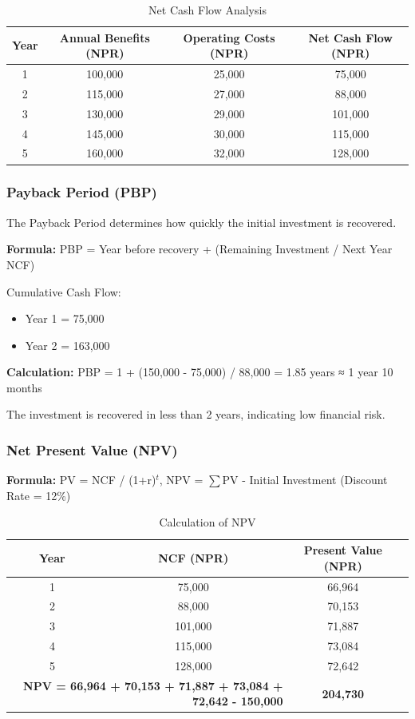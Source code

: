 \documentclass[12pt,a4paper]{report}
\begin{document}
\begin{table}[H]
\centering
\caption{Net Cash Flow Analysis}
\begin{tabular}{cccc}
\toprule
\textbf{Year} & \textbf{Annual Benefits (NPR)} & \textbf{Operating Costs (NPR)} & \textbf{Net Cash Flow (NPR)} \\
\midrule
1 & 100,000 & 25,000 & 75,000 \\
2 & 115,000 & 27,000 & 88,000 \\
3 & 130,000 & 29,000 & 101,000 \\
4 & 145,000 & 30,000 & 115,000 \\
5 & 160,000 & 32,000 & 128,000 \\
\bottomrule
\end{tabular}
\end{table}

\subsubsection{Payback Period (PBP)}
The Payback Period determines how quickly the initial investment is recovered.

\textbf{Formula:} PBP = Year before recovery + (Remaining Investment / Next Year NCF)

Cumulative Cash Flow:
\begin{itemize}[nolistsep]
    \item Year 1 = 75,000
    \item Year 2 = 163,000
\end{itemize}

\textbf{Calculation:}
PBP = 1 + (150,000 - 75,000) / 88,000 = 1.85 years ≈ 1 year 10 months

The investment is recovered in less than 2 years, indicating low financial risk.

\subsubsection{Net Present Value (NPV)}
\textbf{Formula:} PV = NCF / (1+r)$^t$, NPV = $\sum$PV - Initial Investment (Discount Rate = 12\%)

\begin{table}[H]
\centering
\caption{Calculation of NPV}
\begin{tabular}{cccc}
\toprule
\textbf{Year} & \textbf{NCF (NPR)} & \textbf{Present Value (NPR)} \\
\midrule
1 & 75,000 & 66,964 \\
2 & 88,000 & 70,153 \\
3 & 101,000 & 71,887 \\
4 & 115,000 & 73,084 \\
5 & 128,000 & 72,642 \\
\midrule
\multicolumn{2}{r}{\textbf{NPV = 66,964 + 70,153 + 71,887 + 73,084 + 72,642 - 150,000}} & \textbf{204,730} \\
\bottomrule
\end{tabular}
\end{table}
\end{document}
